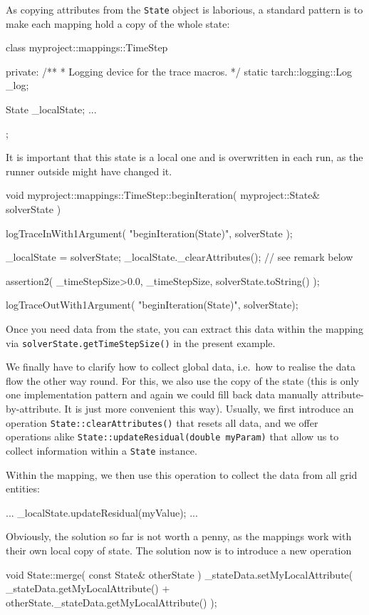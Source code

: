 As copying attributes from the \texttt{State} object is laborious, a standard
pattern is to make each mapping hold a copy of the whole state:

\begin{code}
class myproject::mappings::TimeStep {
  private:
    /**
     * Logging device for the trace macros.
     */
    static tarch::logging::Log  _log;

    State _localState;
    ...
};
\end{code}

\noindent
It is important that this state is a local one and is overwritten in each run,
as the runner outside might have changed it.

\begin{code}
void myproject::mappings::TimeStep::beginIteration(
  myproject::State&  solverState
) {
  logTraceInWith1Argument( "beginIteration(State)", solverState );

  _localState  = solverState;
  _localState._clearAttributes(); // see remark below

  assertion2( _timeStepSize>0.0, _timeStepSize, solverState.toString() );

  logTraceOutWith1Argument( "beginIteration(State)", solverState);
}
\end{code}

\noindent
Once you need data from the state, you can extract this data within the mapping
via \linebreak \texttt{solverState.getTimeStepSize()} in the present example.


We finally have to clarify how to collect global data, i.e.~how to realise the
data flow the other way round. 
For this, we also use the copy of the state (this is only one implementation
pattern and again we could fill back data manually attribute-by-attribute. It
is just more convenient this way).
Usually, we first introduce an operation \texttt{State::clearAttributes()} that
resets all data, and we offer operations alike
\texttt{State::updateResidual(double myParam)} that allow us to collect
information within a \texttt{State} instance.

Within the mapping, we then use this operation to collect the data from all grid
entities:
\begin{code}
  ...
  _localState.updateResidual(myValue); 
  ...
\end{code}

\noindent
Obviously, the solution so far is not worth a penny, as the mappings work with
their own local copy of state. 
The solution now is to introduce a new operation 
\begin{code}
void State::merge( const State& otherState ) {
  _stateData.setMyLocalAttribute( 
    _stateData.getMyLocalAttribute() +
    otherState._stateData.getMyLocalAttribute() 
  ); 
}
\end{code}

